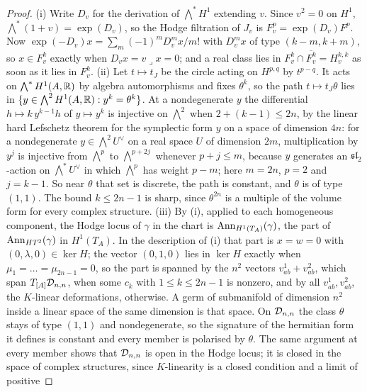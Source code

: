 \begin{proof}
(i) Write $D_{v}$ for the derivation of $\bigwedge^{*}H^{1}$ extending $v$.
Since $v^{2}=0$ on $H^{1}$, $\bigwedge^{*}(1+v)=\exp(D_{v})$, so the Hodge
filtration of $J_{v}$ is $F^{p}_{v}=\exp(D_{v})F^{p}$. Now
$\exp(-D_{v})x=\sum_{m}(-1)^{m}D_{v}^{m}x/m!$ with $D_{v}^{m}x$ of type
$(k-m,k+m)$, so $x\in F^{k}_{v}$ exactly when $D_{v}x=v\lrcorner x=0$; and a
real class lies in $F^{k}_{v}\cap\overline{F^{k}_{v}}=H^{k,k}_{v}$ as soon as
it lies in $F^{k}_{v}$. (ii) Let $t\mapsto t_{J}$ be the circle acting on
$H^{p,q}$ by $t^{p-q}$. It acts on $\bigwedge^{*}H^{1}(A,\mathbb{R})$ by algebra
automorphisms and fixes $\theta^{k}$, so the path $t\mapsto t_{J}\theta$ lies in
$\{y\in\bigwedge^{2}H^{1}(A,\mathbb{R}):y^{k}=\theta^{k}\}$. At a nondegenerate $y$
the differential $h\mapsto k\,y^{k-1}h$ of $y\mapsto y^{k}$ is injective on
$\bigwedge^{2}$ when $2+(k-1)\le2n$, by the linear hard Lefschetz theorem for
the symplectic form $y$ on a space of dimension $4n$: for a nondegenerate
$y\in\bigwedge^{2}U^{\vee}$ on a real space $U$ of dimension $2m$,
multiplication by $y^{j}$ is injective from $\bigwedge^{p}$ to
$\bigwedge^{p+2j}$ whenever $p+j\le m$, because $y$ generates an
$\mathfrak{sl}_{2}$-action on $\bigwedge^{*}U^{\vee}$ in which $\bigwedge^{p}$
has weight $p-m$; here $m=2n$, $p=2$ and $j=k-1$. So near $\theta$ that set
is discrete, the path is constant, and $\theta$ is of type $(1,1)$. The bound
$k\le2n-1$ is sharp, since $\theta^{2n}$ is a multiple of the volume form for
every complex structure. (iii) By
(i), applied to each homogeneous component, the Hodge locus of $\gamma$ in the
chart is $\operatorname{Ann}_{H^{1}(T_{A})}(\gamma)$, the part of $\operatorname{Ann}_{HT^{2}}(\gamma)$ in
$H^{1}(T_{A})$. In the description of (i) that part is
$x=w=0$ with $(0,\lambda,0)\in\ker H$; the vector $(0,1,0)$ lies in $\ker H$
exactly when $\mu_{1}=\dots=\mu_{2n-1}=0$, so the part is spanned by the $n^{2}$
vectors $v^{1}_{ab}+v^{2}_{ab}$, which span $T_{[A]}\mathcal{D}_{n,n}$, when some
$c_{k}$ with $1\le k\le2n-1$ is nonzero, and by all $v^{1}_{ab},v^{2}_{ab}$,
the $K$-linear deformations, otherwise. A germ of submanifold of dimension
$n^{2}$ inside a linear space of the same dimension is that space. On
$\mathcal{D}_{n,n}$ the class $\theta$ stays of type $(1,1)$ and nondegenerate, so the
signature of the hermitian form it defines is constant and every member is
polarised by $\theta$. The same argument at every member shows that
$\mathcal{D}_{n,n}$ is open in the Hodge locus; it is closed in the space of complex
structures, since $K$-linearity is a closed condition and a limit of positive

\end{proof}
